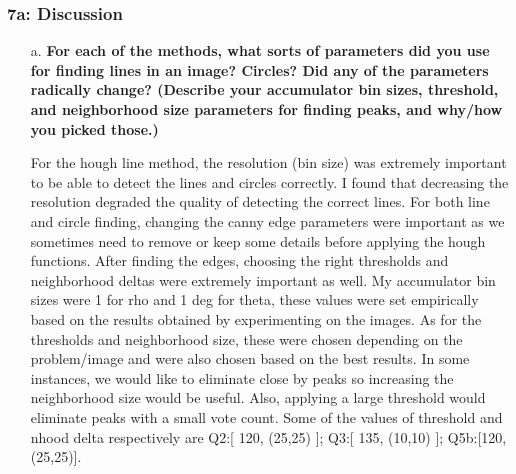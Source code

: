 	\begin{frame}[t]
		\frametitle{7a: Discussion}
		
		\begin{normalsize}
			\begin{itemize}
				\setlength\itemsep{1em}
				
				\item[a.] \textbf{For each of the methods, what sorts of parameters did you use for finding lines in an image? Circles?  Did any of the parameters radically change?  (Describe your accumulator bin sizes, threshold, and neighborhood size parameters for finding peaks, and why/how you picked those.)
}
				
				\item[] For the hough line method, the resolution (bin size) was extremely important to be able to detect the lines and circles correctly. I found that decreasing the resolution degraded the quality of detecting the correct lines. For both line and circle finding, changing the canny edge parameters were important as we sometimes need to remove or keep some details before applying the hough functions. After finding the edges, choosing the right thresholds and neighborhood deltas were extremely important as well. My accumulator bin sizes were 1 for rho and 1 deg for theta, these values were set empirically based on the results obtained by experimenting on the images. As for the thresholds and neighborhood size, these were chosen depending on the problem/image and were also chosen based on the best results. In some instances, we would like to eliminate close by peaks so increasing the neighborhood size would be useful. Also, applying a large threshold would eliminate peaks with a small vote count. Some of the values of threshold and nhood delta respectively are Q2:[ 120, (25,25) ]; Q3:[ 135, (10,10) ]; Q5b:[120, (25,25)].
			\end{itemize}
		\end{normalsize}
		
	\end{frame}

